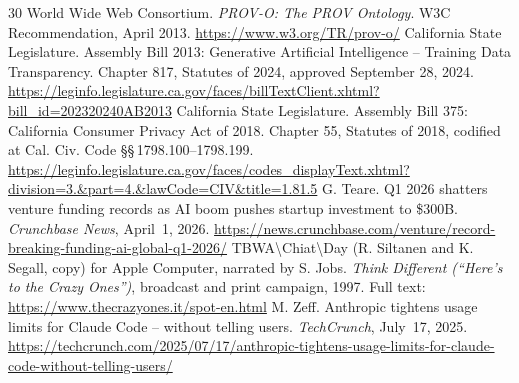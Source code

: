 \documentclass[10pt,a4paper,twocolumn]{article}
\begin{document}
{\begin{thebibliography}{30}
 World Wide Web Consortium. \emph{PROV-O: The PROV Ontology}. W3C Recommendation, April 2013. \url{https://www.w3.org/TR/prov-o/}
 California State Legislature. Assembly Bill 2013: Generative Artificial Intelligence -- Training Data Transparency. Chapter 817, Statutes of 2024, approved September 28, 2024. \url{https://leginfo.legislature.ca.gov/faces/billTextClient.xhtml?bill_id=202320240AB2013}
 California State Legislature. Assembly Bill 375: California Consumer Privacy Act of 2018. Chapter 55, Statutes of 2018, codified at Cal. Civ. Code \S\S\,1798.100--1798.199. \url{https://leginfo.legislature.ca.gov/faces/codes_displayText.xhtml?division=3.&part=4.&lawCode=CIV&title=1.81.5}
 G. Teare. Q1 2026 shatters venture funding records as AI boom pushes startup investment to \$300B. \emph{Crunchbase News}, April~1, 2026. \url{https://news.crunchbase.com/venture/record-breaking-funding-ai-global-q1-2026/}
 TBWA\textbackslash{}Chiat\textbackslash{}Day (R. Siltanen and K. Segall, copy) for Apple Computer, narrated by S. Jobs. \emph{Think Different (``Here's to the Crazy Ones'')}, broadcast and print campaign, 1997. Full text: \url{https://www.thecrazyones.it/spot-en.html}
 M. Zeff. Anthropic tightens usage limits for Claude Code -- without telling users. \emph{TechCrunch}, July~17, 2025. \url{https://techcrunch.com/2025/07/17/anthropic-tightens-usage-limits-for-claude-code-without-telling-users/}
\end{thebibliography}
}
\end{document}
